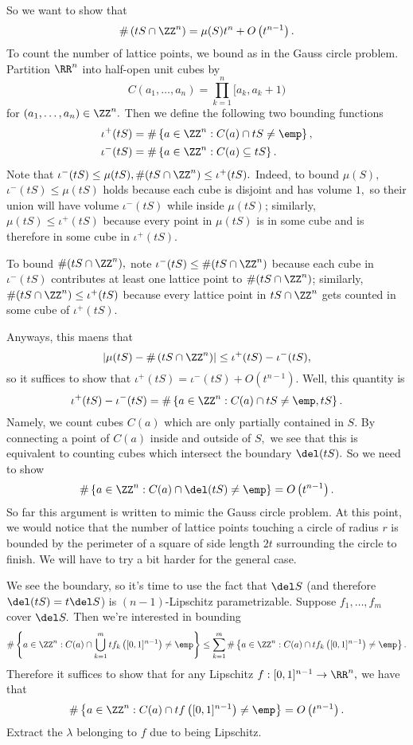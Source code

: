 So we want to show that
\[\#\left(tS\cap\ZZ^n\right)=\mu(S)t^n+O\left(t^{n-1}\right).\]
To count the number of lattice points, we bound as in the Gauss circle problem. Partition $\RR^n$ into half-open unit cubes by
\[C(a_1,\ldots,a_n)=\prod_{k=1}^n[a_k,a_k+1)\]
for $(a_1,\ldots,a_n)\in\ZZ^n.$ Then we define the following two bounding functions
\begin{align*}
    \iota^+(tS) &= \#\left\{a\in\ZZ^n:C(a)\cap tS\ne\emp\right\},\\
    \iota^-(tS) &= \#\left\{a\in\ZZ^n:C(a)\subseteq tS\right\}.
\end{align*}
Note that $\iota^-(tS)\le\mu(tS),\#(tS\cap\ZZ^n)\le\iota^+(tS).$ Indeed, to bound $\mu(S),$ $\iota^-(tS)\le\mu(tS)$ holds because each cube is disjoint and has volume $1,$ so their union will have volume $\iota^-(tS)$ while inside $\mu(tS)$; similarly, $\mu(tS)\le\iota^+(tS)$ because every point in $\mu(tS)$ is in some cube and is therefore in some cube in $\iota^+(tS).$

To bound $\#(tS\cap\ZZ^n),$ note $\iota^-(tS)\le\#(tS\cap\ZZ^n)$ because each cube in $\iota^-(tS)$ contributes at least one lattice point to $\#(tS\cap\ZZ^n)$; similarly, $\#(tS\cap\ZZ^n)\le\iota^+(tS)$ because every lattice point in $tS\cap\ZZ^n$ gets counted in some cube of $\iota^+(tS).$

Anyways, this maens that
\[\left|\mu(tS)-\#\left(tS\cap\ZZ^n\right)\right|\le\iota^+(tS)-\iota^-(tS),\]
so it suffices to show that $\iota^+(tS)=\iota^-(tS)+O\left(t^{n-1}\right).$ Well, this quantity is
\[\iota^+(tS)-\iota^-(tS)=\#\left\{a\in\ZZ^n:C(a)\cap tS\ne\emp,tS\right\}.\]
Namely, we count cubes $C(a)$ which are only partially contained in $S.$ By connecting a point of $C(a)$ inside and outside of $S,$ we see that this is equivalent to counting cubes which intersect the boundary $\del(tS).$ So we need to show
\[\#\left\{a\in\ZZ^n:C(a)\cap\del(tS)\ne\emp\right\}=O\left(t^{n-1}\right).\]
So far this argument is written to mimic the Gauss circle problem. At this point, we would notice that the number of lattice points touching a circle of radius $r$ is bounded by the perimeter of a square of side length $2t$ surrounding the circle to finish. We will have to try a bit harder for the general case.

We see the boundary, so it's time to use the fact that $\del S$ (and therefore $\del(tS)=t\del S$) is $(n-1)$-Lipschitz parametrizable. Suppose $f_1,\ldots,f_m$ cover $\del S.$ Then we're interested in bounding
\[\#\left\{a\in\ZZ^n:C(a)\cap\bigcup_{k=1}^mtf_k\left([0,1]^{n-1}\right)\ne\emp\right\}\le\sum_{k=1}^m\#\left\{a\in\ZZ^n:C(a)\cap tf_k\left([0,1]^{n-1}\right)\ne\emp\right\}.\]
Therefore it suffices to show that for any Lipschitz $f:[0,1]^{n-1}\to\RR^n,$ we have that
\[\#\left\{a\in\ZZ^n:C(a)\cap tf\left([0,1]^{n-1}\right)\ne\emp\right\}=O\left(t^{n-1}\right).\]
Extract the $\lambda$ belonging to $f$ due to being Lipschitz.

